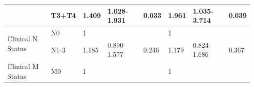 \documentclass[jpm,article,submit,moreauthors,pdftex]{Definitions/mdpi}
\begin{document}
\begin{table}[!hp]
{\begin{tabular}{|l|l|l|l|l|l|l|l|}
\cline{2-8}
                                        & T3+T4                                                                               & 1.409                                                                          & 1.028-1.931                                                                   & \textcolor[rgb]{1,0.149,0}{0.033}                                             & 1.961                                                                          & 1.035-3.714                                                                   & \textcolor[rgb]{1,0.149,0}{0.039}                                              \\ 
\hline
\multirow{2}{*}{Clinical N Status}      & {\cellcolor[rgb]{0.62,0.812,0.878}}N0                                               & {\cellcolor[rgb]{0.62,0.812,0.878}}1                                           & {\cellcolor[rgb]{0.62,0.812,0.878}}                                           & {\cellcolor[rgb]{0.62,0.812,0.878}}                                           & {\cellcolor[rgb]{0.62,0.812,0.878}}1                                           & {\cellcolor[rgb]{0.62,0.812,0.878}}                                           & {\cellcolor[rgb]{0.62,0.812,0.878}}                                            \\ 
\cline{2-8}
                                        & N1-3                                                                                & 1.185                                                                          & 0.890-1.577                                                                   & 0.246                                                                         & 1.179                                                                          & 0.824-1.686                                                                   & 0.367                                                                          \\ 
\hline
\multirow{2}{*}{Clinical M Status}      & {\cellcolor[rgb]{0.62,0.812,0.878}}M0                                               & {\cellcolor[rgb]{0.62,0.812,0.878}}1                                           & {\cellcolor[rgb]{0.62,0.812,0.878}}                                           & {\cellcolor[rgb]{0.62,0.812,0.878}}                                           & {\cellcolor[rgb]{0.62,0.812,0.878}}1                                           & {\cellcolor[rgb]{0.62,0.812,0.878}}                                           & {\cellcolor[rgb]{0.62,0.812,0.878}}                                            \\ 

\end{tabular}}
\end{table}
\end{document}
